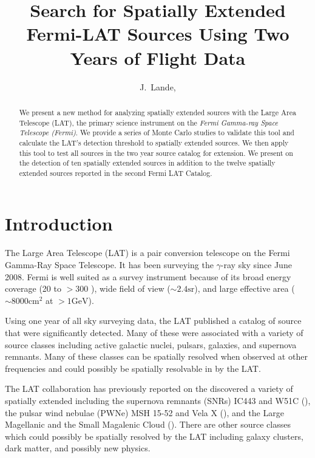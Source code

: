 \documentclass[12pt,preprint]{aastex}
\newcommand{\mev}{\text{MeV}\xspace}
\newcommand{\gev}{\text{GeV}\xspace}
\newcommand{\sr}{\text{sr}\xspace}
\newcommand{\cm}{\text{cm}\xspace}
\begin{document}
\title{Search for Spatially Extended Fermi-LAT Sources Using Two Years of Flight
Data}

\author{
J.~Lande, 
}


\begin{abstract}
We present a new method for analyzing spatially extended sources with
the Large Area Telescope (LAT), the primary science instrument
on the {\em Fermi Gamma-ray Space Telescope (Fermi)}.  We provide a
series of Monte Carlo studies to validate this tool
and calculate the LAT's detection threshold to spatially extended
sources.  We then apply this tool to test all sources in the two
year source catalog for extension. We present on the detection of
ten spatially extended sources in addition to the twelve spatially
extended sources reported in the second Fermi LAT Catalog.
\end{abstract}

\listoftodos

\section{Introduction}

The Large Area Telescope (LAT) is a pair conversion telescope on the
Fermi Gamma-Ray Space Telescope. It has been surveying the $\gamma$-ray
sky since June 2008.  Fermi is well suited as a survey
instrument because of its broad energy coverage (20 \mev
to $>300$ \gev), wide field of view ($\sim 2.4 \sr$), and large effective
area ($\sim 8000 \cm^2$ at $>1 \gev$).

Using one year of all sky surveying data, the LAT published a catalog of
source that were significantly detected.  Many of these were associated
with a variety of source classes including active galactic nuclei,
pulsars, galaxies, and supernova remnants.  Many of these classes can be
spatially resolved when observed at other frequencies and could possibly
be spatially resolvable in \gev by the LAT.

The LAT collaboration has previously reported on the discovered
a variety of spatially extended including the supernova remnants (SNRs)
IC443 and W51C (\cite{ic443,w51c}),
the pulsar wind nebulae (PWNe) MSH 15-52 and Vela X
(\cite{msh1552,velax}), and the Large Magellanic
and the Small Magalenic Cloud (\cite{lmc,smc}).  There are other
source classes which could possibly be spatially resolved by the LAT
including galaxy clusters, dark matter, and possibly new physics.
\end{document}
